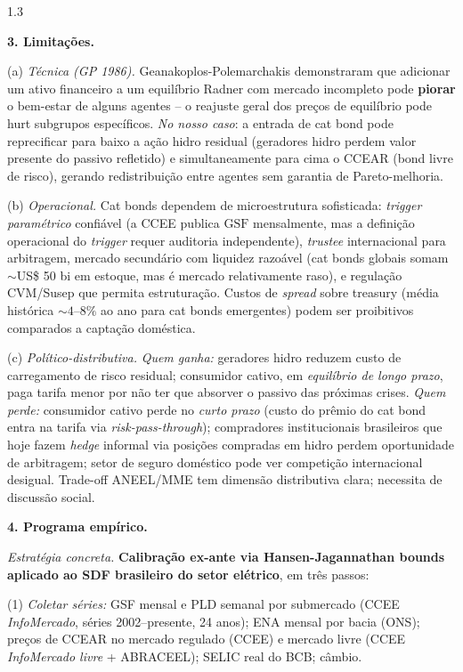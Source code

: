 \documentclass[11pt,addpoints]{exam}
\newcommand{\GSF}{\text{GSF}}
\begin{document}
\begin{spacing}{1.3}
\begin{questions}
\begin{solution}
\textbf{3. Limitações.}

(a) \emph{Técnica (GP 1986).} Geanakoplos-Polemarchakis demonstraram que adicionar um ativo financeiro a um equilíbrio Radner com mercado incompleto pode \textbf{piorar} o bem-estar de alguns agentes -- o reajuste geral dos preços de equilíbrio pode hurt subgrupos específicos. \emph{No nosso caso}: a entrada de cat bond pode reprecificar para baixo a ação hidro residual (geradores hidro perdem valor presente do passivo refletido) e simultaneamente para cima o CCEAR (bond livre de risco), gerando redistribuição entre agentes sem garantia de Pareto-melhoria.

(b) \emph{Operacional.} Cat bonds dependem de microestrutura sofisticada: \emph{trigger paramétrico} confiável (a CCEE publica $\GSF$ mensalmente, mas a definição operacional do \emph{trigger} requer auditoria independente), \emph{trustee} internacional para arbitragem, mercado secundário com liquidez razoável (cat bonds globais somam $\sim$US\$ 50 bi em estoque, mas é mercado relativamente raso), e regulação CVM/Susep que permita estruturação. Custos de \emph{spread} sobre treasury (média histórica $\sim 4$--$8\%$ ao ano para cat bonds emergentes) podem ser proibitivos comparados a captação doméstica.

(c) \emph{Político-distributiva.} \emph{Quem ganha:} geradores hidro reduzem custo de carregamento de risco residual; consumidor cativo, em \emph{equilíbrio de longo prazo}, paga tarifa menor por não ter que absorver o passivo das próximas crises. \emph{Quem perde:} consumidor cativo perde no \emph{curto prazo} (custo do prêmio do cat bond entra na tarifa via \emph{risk-pass-through}); compradores institucionais brasileiros que hoje fazem \emph{hedge} informal via posições compradas em hidro perdem oportunidade de arbitragem; setor de seguro doméstico pode ver competição internacional desigual. Trade-off ANEEL/MME tem dimensão distributiva clara; necessita de discussão social.

\textbf{4. Programa empírico.}

\emph{Estratégia concreta.} \textbf{Calibração ex-ante via Hansen-Jagannathan bounds aplicado ao SDF brasileiro do setor elétrico}, em três passos:

(1) \emph{Coletar séries:} GSF mensal e PLD semanal por submercado (CCEE \emph{InfoMercado}, séries 2002--presente, 24 anos); ENA mensal por bacia (ONS); preços de CCEAR no mercado regulado (CCEE) e mercado livre (CCEE \emph{InfoMercado livre} + ABRACEEL); SELIC real do BCB; câmbio.


\end{solution}
\end{questions}
\end{spacing}
\end{document}
